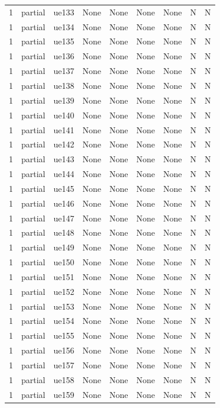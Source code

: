 \begin{table}[ht]
\begin{tabular}{|c|c|c|c|c|c|c|c|c|}
1 & partial & ue133 & None & None & None & None & N & N \\
1 & partial & ue134 & None & None & None & None & N & N \\
1 & partial & ue135 & None & None & None & None & N & N \\
1 & partial & ue136 & None & None & None & None & N & N \\
1 & partial & ue137 & None & None & None & None & N & N \\
1 & partial & ue138 & None & None & None & None & N & N \\
1 & partial & ue139 & None & None & None & None & N & N \\
1 & partial & ue140 & None & None & None & None & N & N \\
1 & partial & ue141 & None & None & None & None & N & N \\
1 & partial & ue142 & None & None & None & None & N & N \\
1 & partial & ue143 & None & None & None & None & N & N \\
1 & partial & ue144 & None & None & None & None & N & N \\
1 & partial & ue145 & None & None & None & None & N & N \\
1 & partial & ue146 & None & None & None & None & N & N \\
1 & partial & ue147 & None & None & None & None & N & N \\
1 & partial & ue148 & None & None & None & None & N & N \\
1 & partial & ue149 & None & None & None & None & N & N \\
1 & partial & ue150 & None & None & None & None & N & N \\
1 & partial & ue151 & None & None & None & None & N & N \\
1 & partial & ue152 & None & None & None & None & N & N \\
1 & partial & ue153 & None & None & None & None & N & N \\
1 & partial & ue154 & None & None & None & None & N & N \\
1 & partial & ue155 & None & None & None & None & N & N \\
1 & partial & ue156 & None & None & None & None & N & N \\
1 & partial & ue157 & None & None & None & None & N & N \\
1 & partial & ue158 & None & None & None & None & N & N \\
1 & partial & ue159 & None & None & None & None & N & N \\

\end{tabular}
\end{table}
